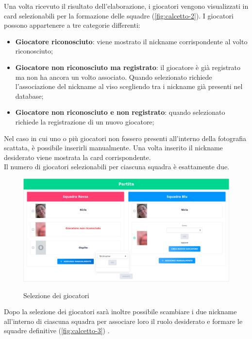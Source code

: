 		\noindent Una volta ricevuto il risultato dell'elaborazione, i giocatori vengono visualizzati in card selezionabili per la formazione delle squadre (\autoref{fig:calcetto-2}). I giocatori possono appartenere a tre categorie differenti:
		\begin{itemize}
			\item \textbf{Giocatore riconosciuto}: viene mostrato il nickname corrispondente al volto riconosciuto;
			\item \textbf{Giocatore non riconosciuto ma registrato}: il giocatore è già registrato ma non ha ancora un volto associato. Quando selezionato richiede l'associazione del nickname al viso scegliendo tra i nickname già presenti nel database;  
			\item\textbf{Giocatore non riconosciuto e non registrato}: quando selezionato richiede la registrazione di un nuovo giocatore; 
		\end{itemize}
	
		\noindent Nel caso in cui uno o più giocatori non fossero presenti all'interno della fotografia scattata, è possibile inserirli manualmente. Una volta inserito il nickname desiderato viene mostrata la card corrispondente. \\
		Il numero di giocatori selezionabili per ciascuna squadra è esattamente due. 
		
		\begin{figure}[H]
			\centering
			\includegraphics[width=\textwidth]{immagini/calcetto-2.png} \\
			\caption{\label{fig:calcetto-2} Selezione dei giocatori}
		\end{figure}
		
		\noindent Dopo la selezione dei giocatori sarà inoltre possibile scambiare i due nickname all'interno di ciascuna squadra per associare loro il ruolo desiderato e formare le squadre definitive (\autoref{fig:calcetto-3}) .
			
